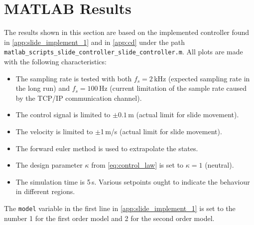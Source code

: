 \vspace{-0.3cm}
\section{MATLAB Results}\label{sec:matlab-results-slide-safety}
\vspace{-0.2cm}
The results shown in this section are based on the implemented controller found in \autoref{app:slide_implement_1} and in \autoref{app:cd} under the path \texttt{matlab\_scripts\_slide\_controller\_slide\_controller.m}. All plots are made with the following characteristics:
\begin{itemize}
\item The sampling rate is tested with both $f_s = 2\,$kHz (expected sampling rate in the long run) and $f_s = 100\,$Hz (current limitation of the sample rate caused by the TCP/IP communication channel).
\item The control signal is limited to $\pm 0.1$\,m (actual limit for slide movement).
\item The velocity is limited to $\pm$1\,m/s (actual limit for slide movement).
\item The forward euler method is used to extrapolate the states.
\item The design parameter $\kappa$ from \autoref{eq:control_law} is set to $\kappa=1$ (neutral).
\item The simulation time is 5\,s. Various setpoints ought to indicate the behaviour in different regions.
\end{itemize}
The \texttt{model} variable in the first line in \autoref{app:slide_implement_1} is set to the number 1 for the first order model and 2 for the second order model. 
\vspace{-0.3cm}
